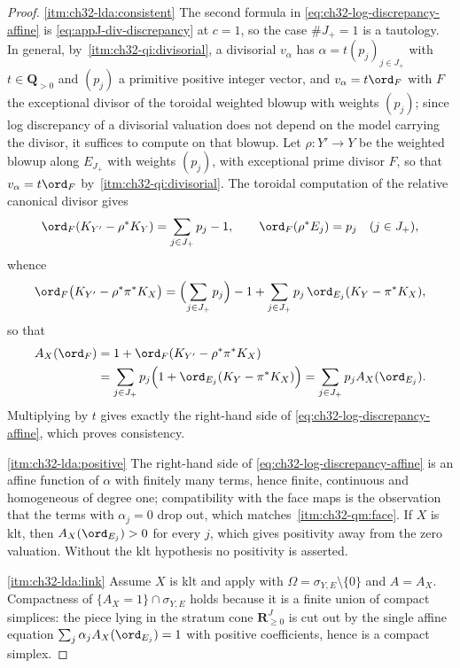 \begin{proof}
\cref{itm:ch32-lda:consistent}  The second formula in
\eqref{eq:ch32-log-discrepancy-affine} is \eqref{eq:appJ-div-discrepancy}
at $c=1$, so the case $\#J_+=1$ is a tautology.  In general, by
\,\cref{itm:ch32-qi:divisorial}, a
divisorial $v_\alpha$ has $\alpha=t(p_j)_{j\in J_+}$ with
$t\in\mathbf Q_{>0}$ and $(p_j)$ a primitive positive integer vector, and
$v_\alpha=t\ord_F$
with $F$ the exceptional divisor of the toroidal weighted blowup with
weights $(p_j)$; since log discrepancy of a divisorial valuation does not
depend on the model carrying the divisor, it suffices to compute on that
blowup.  Let
$\rho:Y'\to Y$ be the weighted blowup along $E_{J_+}$ with weights
$(p_j)$, with exceptional prime divisor $F$, so that
$v_\alpha=t\ord_F$ by
\,\cref{itm:ch32-qi:divisorial}.
The toroidal computation of the relative canonical divisor gives
\[
 \ord_F(K_{Y'}-\rho^*K_Y)=\sum_{j\in J_+}p_j-1,
 \qquad
 \ord_F(\rho^*E_j)=p_j\quad(j\in J_+),
\]
whence
\[
 \ord_F\bigl(K_{Y'}-\rho^*\pi^*K_X\bigr)
 =\Bigl(\sum_{j\in J_+}p_j\Bigr)-1
  +\sum_{j\in J_+}p_j\,\ord_{E_j}(K_Y-\pi^*K_X),
\]
so that
\[
\begin{split}
 A_X(\ord_F)&=1+\ord_F(K_{Y'}-\rho^*\pi^*K_X)\\
 &=\sum_{j\in J_+}p_j\Bigl(1+\ord_{E_j}(K_Y-\pi^*K_X)\Bigr)
 =\sum_{j\in J_+}p_jA_X(\ord_{E_j}).
\end{split}
\]
Multiplying by $t$ gives exactly the right-hand side of
\eqref{eq:ch32-log-discrepancy-affine}, which proves consistency.

\cref{itm:ch32-lda:positive}  The right-hand side of
\eqref{eq:ch32-log-discrepancy-affine} is an affine function of $\alpha$
with finitely many terms, hence finite, continuous and homogeneous of degree
one; compatibility with the face maps is the observation that the terms with
$\alpha_j=0$ drop out, which matches
\,\cref{itm:ch32-qm:face}.  If $X$ is klt,
then $A_X(\ord_{E_j})>0$ for every $j$, which gives positivity away from
the zero valuation.  Without the klt hypothesis no positivity is asserted.

\cref{itm:ch32-lda:link}  Assume $X$ is klt and apply
 with
$\Omega=\sigma_{Y,E}\setminus\{0\}$ and $A=A_X$.  Compactness of
$\{A_X=1\}\cap\sigma_{Y,E}$ holds because it is a finite union of compact
simplices: the piece lying in the stratum cone $\mathbf R_{\geq0}^J$ is cut
out by the single affine equation $\sum_j\alpha_jA_X(\ord_{E_j})=1$ with
positive coefficients, hence is a compact simplex.
\end{proof}

